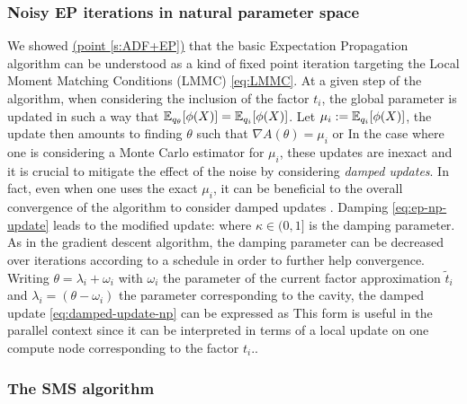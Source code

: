 \subsubsection*{Noisy EP iterations in natural parameter space}
We showed \hyperref[s:ADF+EP]{(point \ref*{s:ADF+EP})} that the basic Expectation Propagation algorithm can be understood as a kind of fixed point iteration targeting the Local Moment Matching Conditions (LMMC) \eqref{eq:LMMC}.
At a given step of the algorithm, when considering the inclusion of the factor $t_i$, the global parameter is updated in such a way that $\mathbb E_{q_\theta}[\phi(X)]= \mathbb E_{q_i}[\phi(X)]$. Let $\mu_i:=\mathbb E_{q_i}[\phi(X)]$, the update then amounts to finding $\theta$ such that $\nabla A(\theta) = \mu_i$ or
%
%
In the case where one is considering a Monte Carlo estimator for $\mu_i$, these updates are inexact and it is crucial to mitigate the effect of the noise by considering \emph{damped updates}. In fact, even when one uses the exact $\mu_i$, it can be beneficial to the overall convergence of the algorithm to consider damped updates . Damping \eqref{eq:ep-np-update} leads to the modified update:
%
%
where $\kappa \in(0,1]$ is the damping parameter. As in the gradient descent algorithm, the damping parameter can be decreased over iterations according to a schedule in order to further help convergence.
Writing $\theta=\lambda_i+\omega_i$ with $\omega_i$ the parameter of the current factor approximation $\tilde t_i$ and $\lambda_i=(\theta-\omega_i)$ the parameter corresponding to the cavity, the damped update \eqref{eq:damped-update-np} can be expressed as
%
%
This form is useful in the parallel context since it can be interpreted in terms of a local update on one compute node corresponding to the factor $t_i$..

\subsubsection*{The SMS algorithm}

\subsection{}
